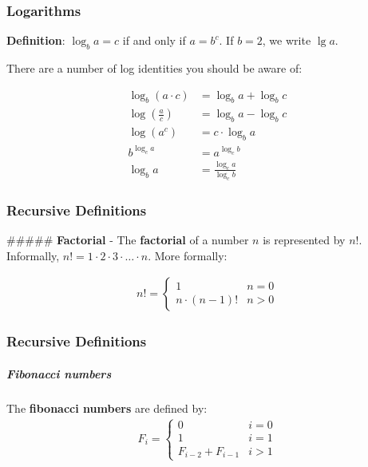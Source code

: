 \documentclass[11pt]{article}
\begin{document}
    \hypertarget{logarithms}{%
\subsubsection{Logarithms}\label{logarithms}}

\textbf{Definition}: \(\log_b a = c\) if and only if \(a = b^c\). If
\(b = 2\), we write \(\lg a\).

There are a number of log identities you should be aware of:

\begin{align}
        \log_b (a \cdot c) &= \log_b a + \log_b c \\
        \log \left( \frac{a}{c} \right) &= \log_b a - \log_b c \\
        \log(a^c) &= c \cdot \log_b a \\
        b^{\log_c a} &= a^{\log_c b} \\
        \log_b a &= \frac{\log_c a}{\log_c b}
    \end{align}

    \hypertarget{recursive-definitions}{%
\subsubsection{Recursive Definitions}\label{recursive-definitions}}

\#\#\#\#\# \textbf{Factorial} - The \textbf{factorial} of a number \(n\)
is represented by \(n!\). Informally,
\(n! = 1 \cdot 2 \cdot 3 \cdot \ldots \cdot n\). More formally:

\begin{align*}
            n! = \begin{cases}
                1 & n = 0 \\
                n \cdot (n - 1)! & n > 0
            \end{cases}
\end{align*}

    \hypertarget{recursive-definitions}{%
\subsubsection{Recursive Definitions}\label{recursive-definitions}}

\hypertarget{fibonacci-numbers}{%
\subparagraph{Fibonacci numbers}\label{fibonacci-numbers}}

The \textbf{fibonacci numbers} are defined by: \begin{align*}
            F_i = \begin{cases}
                0 & i = 0 \\
                1 & i = 1 \\
                F_{i - 2} + F_{i - 1} & i > 1
            \end{cases}
        \end{align*}
\end{document}
